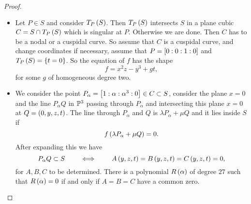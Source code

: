 \begin{proof}
\hfill
\begin{itemize}
\item Let $ P \in S $ and consider $ T_P\rb{S} $. Then $ T_P\rb{S} $ intersects $ S $ in a plane cubic $ C = S \cap T_P\rb{S} $ which is singular at $ P $. Otherwise we are done. Then $ C $ has to be a nodal or a cuspidal curve. So assume that $ C $ is a cuspidal curve, and change coordinates if necessary, assume that $ P = \sb{0 : 0 : 1 : 0} $ and $ T_P\rb{S} = \cb{t = 0} $. So the equation of $ f $ has the shape
$$ f = x^2z - y^3 + gt, $$
for some $ g $ of homogeneous degree two.
\item We consider the point $ P_\alpha = \sb{1 : \alpha : \alpha^3 : 0} \in C \subset S $, consider the plane $ x = 0 $ and the line $ P_\alpha Q $ in $ \P^3 $ passing through $ P_\alpha $ and intersecting this plane $ x = 0 $ at $ Q = \rb{0, y, z, t} $. The line through $ P_\alpha $ and $ Q $ is $ \lambda P_\alpha + \mu Q $ and it lies inside $ S $ if
$$ f\rb{\lambda P_\alpha + \mu Q} = 0. $$
After expanding this we have
$$ P_\alpha Q \subset S \qquad \iff \qquad A\rb{y, z, t} = B\rb{y, z, t} = C\rb{y, z, t} = 0, $$
for $ A, B, C $ to be determined. There is a polynomial $ R\rb{\alpha} $ of degree $ 27 $ such that $ R\rb{\alpha} = 0 $ if and only if $ A = B = C $ have a common zero.



\end{itemize}
\end{proof}
